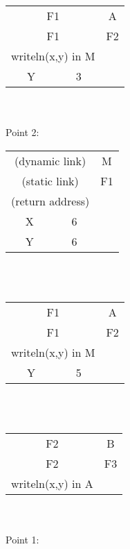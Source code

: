 \documentclass[fleqn, 12pt]{article}
\begin{document}
\begin{tabular}{ | c | c | c}
    \cline{1-2}
    \multicolumn{2}{|c|}{F1} & A \\\cline{1-2}
    \multicolumn{2}{|c|}{F1} & F2 \\\cline{1-2}
    \multicolumn{2}{|c|}{writeln(x,y) in M} & \\\cline{1-2}
    Y & 3\\\cline{1-2}
\end{tabular}\\\\



Point 2:\\

\begin{tabular}{ | c | c | c}
    \cline{1-2}
    \multicolumn{2}{|c|}{(dynamic link)} & M \\\cline{1-2}
    \multicolumn{2}{|c|}{(static link)} & F1 \\\cline{1-2}
    \multicolumn{2}{|c|}{(return address)} \\\cline{1-2}
    X & 6\\\cline{1-2}
    Y & 6\\\cline{1-2}
\end{tabular}\\\\

\begin{tabular}{ | c | c | c}
    \cline{1-2}
    \multicolumn{2}{|c|}{F1} & A \\\cline{1-2}
    \multicolumn{2}{|c|}{F1} & F2 \\\cline{1-2}
    \multicolumn{2}{|c|}{writeln(x,y) in M} & \\\cline{1-2}
    Y & 5\\\cline{1-2}
\end{tabular}\\\\

\begin{tabular}{ | c | c | c}
    \cline{1-2}
    \multicolumn{2}{|c|}{F2} & B \\\cline{1-2}
    \multicolumn{2}{|c|}{F2} & F3 \\\cline{1-2}
    \multicolumn{2}{|c|}{writeln(x,y) in A} & \\\cline{1-2}
\end{tabular}\\\\

Point 1:\\
\end{document}
